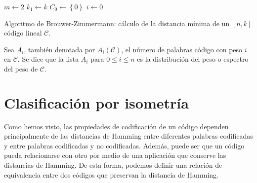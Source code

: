 \begin{Ualgorithm}[htbp]
    \DontPrintSemicolon
    $m \longleftarrow 2$\;
    $k_1 \longleftarrow k$\;
    $C_0 \longleftarrow \left\lbrace 0 \right\rbrace$\;
    $i \longleftarrow 0$\;
    \caption{Algoritmo de Brouwer-Zimmermann: cálculo de la distancia mínima de un $[n,k]$ código lineal $\mathcal{C}$.}
\end{Ualgorithm}

\begin{definition}
    Sea $A_i$, también denotada por $A_i(\mathcal{C})$, el número de palabras código con peso $i$ en $\mathcal{C}$. Se dice que la lista $A_i$ para $0 \leq i \leq n$ es la distribución del peso o espectro del peso de $\mathcal{C}$.
\end{definition}

\section{Clasificación por isometría}

Como hemos visto, las propiedades de codificación de un código dependen principalmente de las distancias de Hamming entre diferentes palabras codificadas y entre palabras codificadas y no codificadas. Además, puede ser que un código pueda relacionarse con otro por medio de una aplicación que conserve las distancias de Hamming. De esta forma, podemos definir una relación de equivalencia entre dos códigos que preservan la distancia de Hamming.

